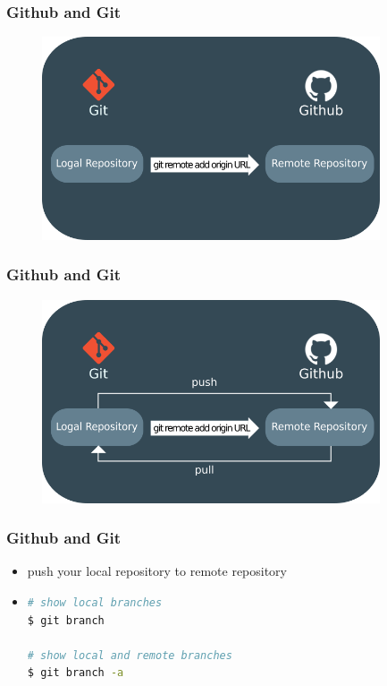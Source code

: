 \documentclass{beamer}
\begin{document}
	\begin{frame}
		\frametitle{Github and Git}
		\begin{figure}[htbp]
			\centering
			\includegraphics[width=10cm]{githubgit2}
		\end{figure}
	\end{frame}
	
	\begin{frame}
		\frametitle{Github and Git}
		\begin{figure}[htbp]
			\centering
			\includegraphics[width=10cm]{githubgit3}
		\end{figure}
	\end{frame}
	
	\begin{frame}[fragile]
		\frametitle{Github and Git}
		\begin{itemize}
			\item push your local repository to remote repository
			\item 
\begin{lstlisting}[language=bash]
# show local branches
$ git branch

# show local and remote branches
$ git branch -a
\end{lstlisting}		
		\end{itemize}
	\end{frame}
	
\end{document}
